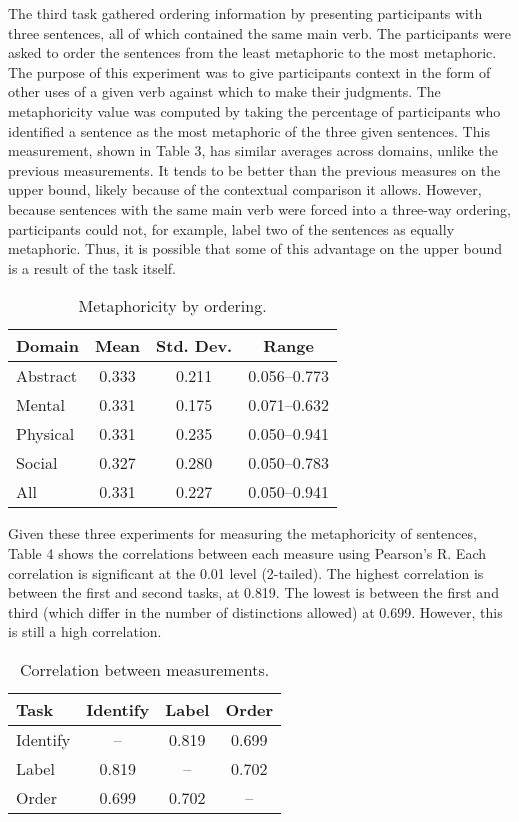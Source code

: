 \documentclass[11pt]{article}
\begin{document}
The third task gathered ordering information by presenting participants with three sentences, all of which contained the same main verb. The participants were asked to order the sentences from the least metaphoric to the most metaphoric. The purpose of this experiment was to give participants context in the form of other uses of a given verb against which to make their judgments. The metaphoricity value was computed by taking the percentage of participants who identified a sentence as the most metaphoric of the three given sentences. This measurement, shown in Table 3, has similar averages across domains, unlike the previous measurements. It tends to be better than the previous measures on the upper bound, likely because of the contextual comparison it allows. However, because sentences with the same main verb were forced into a three-way ordering, participants could not, for example, label two of the sentences as equally metaphoric. Thus, it is possible that some of this advantage on the upper bound is a result of the task itself.

\begin{table}[h]
\begin{center}
\begin{tabular}{|l|c|c|c|}
\hline \bf Domain & \bf Mean & \bf Std. Dev. & \bf Range \\ \hline
Abstract & 0.333 & 0.211 & 0.056--0.773 \\
Mental & 0.331 & 0.175 & 0.071--0.632 \\
Physical & 0.331 & 0.235 & 0.050--0.941 \\
Social & 0.327 & 0.280 & 0.050--0.783 \\
All & 0.331 & 0.227 & 0.050--0.941 \\
\hline
\end{tabular}
\end{center}
\caption{\label{font-table} Metaphoricity by ordering. }
\end{table}


Given these three experiments for measuring the metaphoricity of sentences, Table 4 shows the correlations between each measure using Pearson's R. Each correlation is significant at the 0.01 level (2-tailed). The highest correlation is between the first and second tasks, at 0.819. The lowest is between the first and third (which differ in the number of distinctions allowed) at 0.699. However, this is still a high correlation.

\begin{table}[h]
\begin{center}
\begin{tabular}{|l|c|c|c|}
\hline \bf Task & \bf Identify & \bf Label & \bf Order \\ \hline
Identify & -- & 0.819 & 0.699 \\
Label & 0.819 & -- & 0.702 \\
Order & 0.699 & 0.702 & -- \\
\hline
\end{tabular}
\end{center}
\caption{\label{font-table} Correlation between measurements. }
\end{table}
\end{document}

